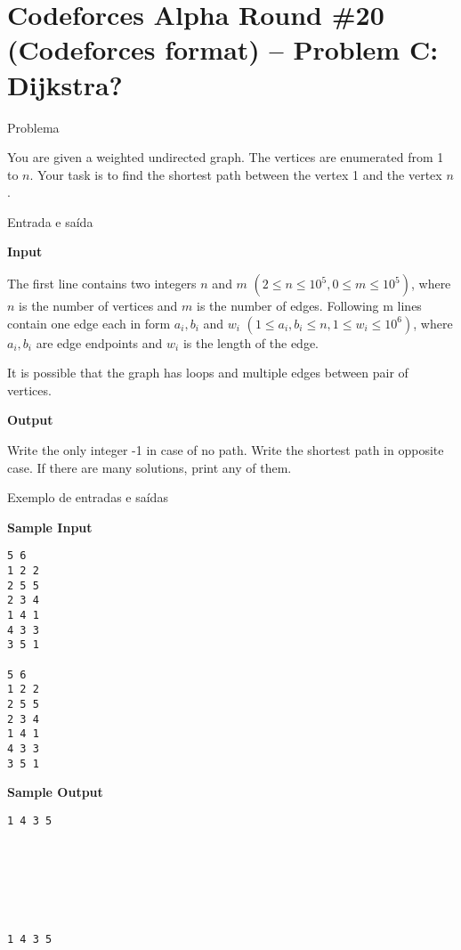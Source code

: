 \section{Codeforces Alpha Round \#20 (Codeforces format) -- Problem C: Dijkstra?}

\begin{frame}[fragile]{Problema}

You are given a weighted undirected graph. The vertices are enumerated from 1 to $n$. Your task is to find the shortest path between the vertex 1 and the vertex $n$.

\end{frame}

\begin{frame}[fragile]{Entrada e saída}

\textbf{Input}

The first line contains two integers $n$ and $m$ $(2\leq n\leq 10^5, 0\leq m\leq 10^5)$, where 
$n$ is the number of vertices and $m$ is the number of edges. Following m lines contain one edge 
each in form $a_i, b_i$ and $w_i$ $(1\leq a_i, b_i\leq n, 1\leq w_i\leq 10^6)$, where 
$a_i, b_i$ are edge endpoints and $w_i$ is the length of the edge.

It is possible that the graph has loops and multiple edges between pair of vertices.

\textbf{Output}

Write the only integer -1 in case of no path. Write the shortest path in opposite case. If there are many solutions, print any of them.

\end{frame}

\begin{frame}[fragile]{Exemplo de entradas e saídas}

\begin{minipage}[t]{0.5\textwidth}
\textbf{Sample Input}
\begin{verbatim}
5 6
1 2 2
2 5 5
2 3 4
1 4 1
4 3 3
3 5 1

5 6
1 2 2
2 5 5
2 3 4
1 4 1
4 3 3
3 5 1
\end{verbatim}
\end{minipage}
\begin{minipage}[t]{0.45\textwidth}
\textbf{Sample Output}
\begin{verbatim}
1 4 3 5 







1 4 3 5 
\end{verbatim}
\end{minipage}
\end{frame}

